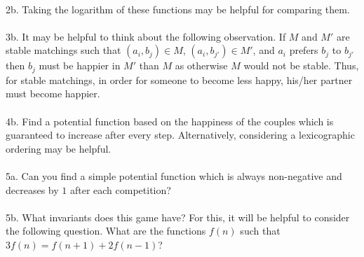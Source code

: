 \documentclass[12pt]{article}
\begin{document}
\\
2b. Taking the logarithm of these functions may be helpful for comparing them.\\
\\
3b. It may be helpful to think about the following observation. If $M$ and $M'$ are stable matchings such that $(a_i,b_j) \in M$, $(a_i,b_{j'}) \in M'$, and $a_i$ prefers $b_j$ to $b_{j'}$ then $b_j$ must be happier in $M'$ than $M$ as otherwise $M$ would not be stable. Thus, for stable matchings, in order for someone to become less happy, his/her partner must become happier.\\
\\
4b. Find a potential function based on the happiness of the couples which is guaranteed to increase after every step. Alternatively, considering a lexicographic ordering may be helpful.\\
\\
5a. Can you find a simple potential function which is always non-negative and decreases by $1$ after each competition?\\
\\
5b. What invariants does this game have? For this, it will be helpful to consider the following question. What are the functions $f(n)$ such that $3f(n) = f(n+1) + 2f(n-1)$?
\end{document}
